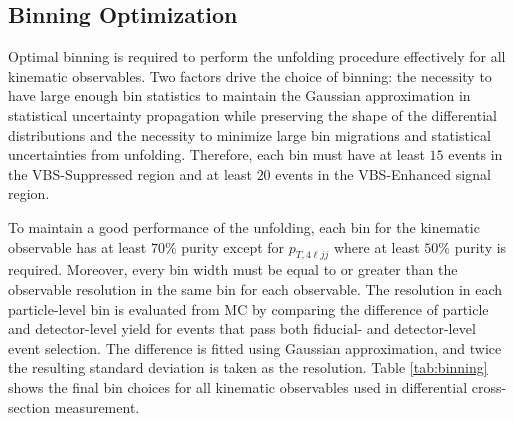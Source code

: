\subsection{Binning Optimization}
\label{subsec:Binning}
Optimal binning is required to perform the unfolding procedure effectively for all kinematic observables. Two factors drive the choice of binning: the necessity to have large enough bin statistics to maintain the Gaussian approximation in statistical uncertainty propagation while preserving the shape of the differential distributions and the necessity to minimize large bin migrations and statistical uncertainties from unfolding. Therefore, each bin must have at least $15$ events in the VBS-Suppressed region and at least $20$ events in the VBS-Enhanced signal region. 

To maintain a good performance of the unfolding, each bin for the kinematic observable has at least $70\%$ purity except for $p_{T,4\ell jj}$ where at least $50\%$ purity is required. Moreover, every bin width must be equal to or greater than the observable resolution in the same bin for each observable. The resolution in each particle-level bin is evaluated from MC by comparing the difference of particle and detector-level yield for events that pass both fiducial- and detector-level event selection. The difference is fitted using Gaussian approximation, and twice the resulting standard deviation is taken as the resolution. Table \ref{tab:binning} shows the final bin choices for all kinematic observables used in differential cross-section measurement.

